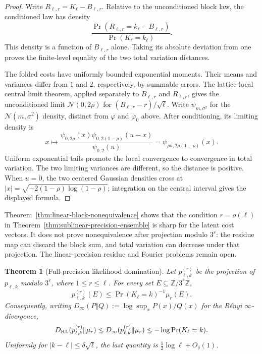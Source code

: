 \documentclass[11pt]{article}
\newtheorem{theorem}{Theorem}[section]
\theoremstyle{remark}
\begin{document}
\begin{proof}
Write $R_{\ell,r}=K_\ell-B_{\ell,r}$. Relative to the
unconditioned block law, the conditioned law has density
\[
 \frac{\Pr(R_{\ell,r}=k_\ell-B_{\ell,r})}
      {\Pr(K_\ell=k_\ell)}.
\]
This density is a function of $B_{\ell,r}$ alone. Taking its absolute
deviation from one proves the finite-level equality of the two total
variation distances.

The folded costs have uniformly bounded exponential moments. Their
means and variances differ from $1$ and $2$, respectively, by summable
errors. The lattice local central limit theorem, applied separately to
$B_{\ell,r}$ and $R_{\ell,r}$, gives the unconditioned limit
$\mathcal N(0,2\rho)$ for
$(B_{\ell,r}-r)/\sqrt\ell$. Write $\psi_{m,\sigma^2}$ for the
$\mathcal N(m,\sigma^2)$ density, distinct from $\varphi$ and
$\varphi_0$ above. After conditioning, its limiting density is
\[
 x\longmapsto
 \frac{\psi_{0,2\rho}(x)\psi_{0,2(1-\rho)}(u-x)}
      {\psi_{0,2}(u)}
 =\psi_{\rho u,2\rho(1-\rho)}(x).
\]
Uniform exponential tails promote the local convergence to convergence
in total variation. The two limiting variances are different, so the
distance is positive. When $u=0$, the two centered Gaussian densities
cross at
$|x|=\sqrt{-2(1-\rho)\log(1-\rho)}$; integration on the central
interval gives the displayed formula.
\end{proof}

Theorem~\ref{thm:linear-block-nonequivalence} shows that the condition
$r=o(\ell)$ in Theorem~\ref{thm:sublinear-precision-ensemble} is sharp
for the latent cost vectors. It does not prove nonequivalence after
projection modulo $3^r$: the residue map can discard the block sum,
and total variation can decrease under that projection. The
linear-precision residue and Fourier problems remain open.

\begin{theorem}[Full-precision likelihood domination]
\label{thm:ensemble-divergence}
Let $p_{\ell,k}^{(r)}$ be the projection of $p_{\ell,k}$ modulo $3^r$,
where $1\le r\le\ell$. For every set
$E\subseteq\mathbb Z/3^r\mathbb Z$,
\begin{equation}\label{eq:ensemble-domination}
 p_{\ell,k}^{(r)}(E)
 \le \Pr(K_\ell=k)^{-1}\mu_r(E).
\end{equation}
Consequently, writing
$D_\infty(P\Vert Q):=\log\sup_x P(x)/Q(x)$ for the R\'enyi
$\infty$-divergence,
\[
 D_{\rm KL}(p_{\ell,k}^{(r)}\Vert\mu_r)
 \le D_\infty(p_{\ell,k}^{(r)}\Vert\mu_r)
 \le-\log\Pr(K_\ell=k).
\]
Uniformly for $|k-\ell|\le\delta\sqrt\ell$, the last quantity is
$\frac12\log\ell+O_\delta(1)$.
\end{theorem}
\end{document}
